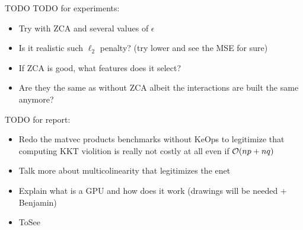 \documentclass[10pt,aspectratio=43]{beamer}
\begin{document}
\begin{frame}{TODO}
    TODO for experiments:
    \begin{itemize}
        \item Try with ZCA and several values of $\epsilon$
        \item Is it realistic such $\ell_2$ penalty? (try lower and see the MSE for sure)
        \item If ZCA is good, what features does it select?
        \item Are they the same as without ZCA albeit the interactions are built the same anymore?
    \end{itemize}
\pause
    TODO for report:
    \begin{itemize}
        \item Redo the matvec products benchmarks without KeOps to legitimize that computing KKT violition is really not costly at all even if $\mathcal{O}(np+nq)$
        \item Talk more about multicolinearity that legitimizes the enet
        \item Explain what is a GPU and how does it work (drawings will be needed + Benjamin)
        \item ToSee
    \end{itemize}
\end{frame}
\end{document}
